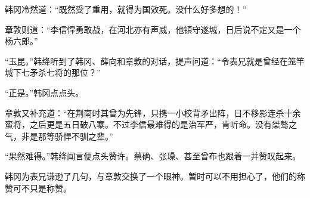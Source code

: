 韩冈冷然道：“既然受了重用，就得为国效死。没什么好多想的！”

章敦则道：“李信悍勇敢战，在河北亦有声威，他镇守遂城，日后说不定又是一个杨六郎。”

“玉昆。”韩绛听到了韩冈、薛向和章敦的对话，提声问道：“令表兄就是曾经在笼竿城下七矛杀七将的那位？”

“正是。”韩冈点点头。

章敦又补充道：“在荆南时其曾为先锋，只携一小校背矛出阵，日不移影连杀十余蛮将，之后更是五日破八寨。不过李信最难得的是治军严，肯听命。没有桀骜之气，非是那等骄悍不驯之辈。”

“果然难得。”韩绛闻言便点头赞许。蔡确、张璪、甚至曾布也跟着一并赞叹起来。

韩冈为表兄谦逊了几句，与章敦交换了一个眼神。暂时可以不用担心了，他们的称赞可不只是称赞。
